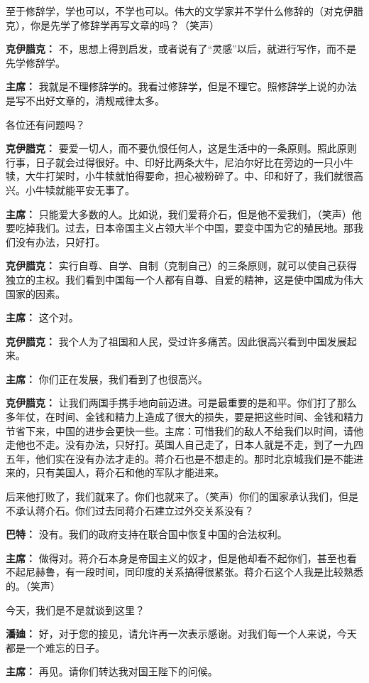 \begin{list}{}
至于修辞学，学也可以，不学也可以。伟大的文学家并不学什么修辞的（对克伊腊克），你是先学了修辞学再写文章的吗？（笑声）

\item[\textbf{克伊腊克：}] 不，思想上得到启发，或者说有了“灵感”以后，就进行写作，而不是先学修辞学。

\item[\textbf{主席：}] 我就是不理修辞学的。我看过修辞学，但是不理它。照修辞学上说的办法是写不出好文章的，清规戒律太多。

各位还有问题吗？

\item[\textbf{克伊腊克：}] 要爱一切人，而不要仇恨任何人，这是生活中的一条原则。照此原则行事，日子就会过得很好。中、印好比两条大牛，尼泊尔好比在旁边的一只小牛犊，大牛打架时，小牛犊就怕得要命，担心被粉碎了。中、印和好了，我们就很高兴。小牛犊就能平安无事了。

\item[\textbf{主席：}] 只能爱大多数的人。比如说，我们爱蒋介石，但是他不爱我们，（笑声）他要吃掉我们。过去，日本帝国主义占领大半个中国，要变中国为它的殖民地。那我们没有办法，只好打。

\item[\textbf{克伊腊克：}] 实行自尊、自学、自制（克制自己）的三条原则，就可以使自己获得独立的主权。我们看到中国每一个人都有自尊、自爱的精神，这是使中国成为伟大国家的因素。

\item[\textbf{主席：}] 这个对。

\item[\textbf{克伊腊克：}] 我个人为了祖国和人民，受过许多痛苦。因此很高兴看到中国发展起来。

\item[\textbf{主席：}] 你们正在发展，我们看到了也很高兴。

\item[\textbf{克伊腊克：}] 让我们两国手携手地向前迈进。可是最重要的是和平。你们打了那么多年仗，在时间、金钱和精力上造成了很大的损失，要是把这些时间、金钱和精力节省下来，中国的进步会更快一些。主席：可惜我们的敌人不给我们以时间，请他走他也不走。没有办法，只好打。英国人自己走了，日本人就是不走，到了一九四五年，他们实在没有办法才走的。蒋介石也是不想走的。那时北京城我们是不能进来的，只有美国人，蒋介石和他的军队才能进来。

后来他打败了，我们就来了。你们也就来了。（笑声）你们的国家承认我们，但是不承认蒋介石。你们过去同蒋介石建立过外交关系没有？

\item[\textbf{巴特：}] 没有。我们的政府支持在联合国中恢复中国的合法权利。

\item[\textbf{主席：}] 做得对。蒋介石本身是帝国主义的奴才，但是他却看不起你们，甚至也看不起尼赫鲁，有一段时间，同印度的关系搞得很紧张。蒋介石这个人我是比较熟悉的。（笑声）

今天，我们是不是就谈到这里？

\item[\textbf{潘廸：}] 好，对于您的接见，请允许再一次表示感谢。对我们每一个人来说，今天都是一个难忘的日子。

\item[\textbf{主席：}] 再见。请你们转达我对国王陛下的问候。
\end{list}
